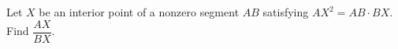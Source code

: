Let $X$ be an interior point of a nonzero segment $AB$ satisfying $AX^2=AB\cdot BX$. Find $\dfrac{AX}{BX}$.
